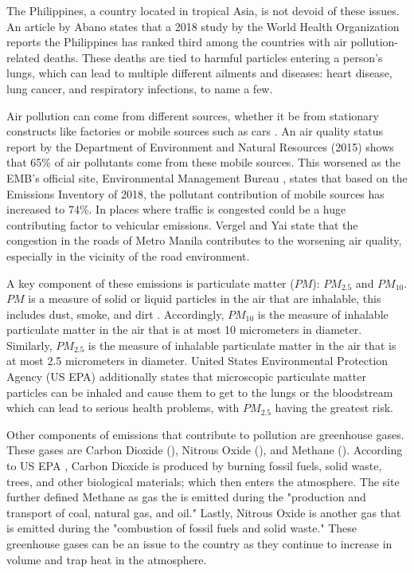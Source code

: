 The Philippines, a country located in tropical Asia, is not devoid of these issues. An article by Abano \citeyear{abano_2019} states that a 2018 study by the World Health Organization reports the Philippines has ranked third among the countries with air pollution-related deaths. These deaths are tied to harmful particles entering a person’s lungs, which can lead to multiple different ailments and diseases: heart disease, lung cancer, and respiratory infections, to name a few.

Air pollution can come from different sources, whether it be from stationary constructs like factories or mobile sources such as cars \cite{EMB_2015}. An air quality status report by the Department of Environment and Natural Resources (2015) shows that 65\% of air pollutants come from these mobile sources. This worsened as the EMB’s official site, Environmental Management Bureau \citeyear{EMB_2018}, states that based on the Emissions Inventory of 2018, the pollutant contribution of mobile sources has increased to  74\%. In places where traffic is congested could be a huge contributing factor to vehicular emissions. Vergel and Yai \citeyear{vergel_yai2000} state that the congestion in the roads of Metro Manila contributes to the worsening air quality, especially in the vicinity of the road environment.

A key component of these emissions is particulate matter ($PM$): $PM_{2.5}$ and $PM_{10}$. $PM$ is a measure of solid or liquid particles in the air that are inhalable, this includes dust, smoke, and dirt \cite{EPA_2022}. Accordingly, $PM_{10}$ is the measure of inhalable particulate matter in the air that is at most 10 micrometers in diameter. Similarly, $PM_{2.5}$ is the measure of inhalable particulate matter in the air that is at most 2.5 micrometers in diameter. United States Environmental Protection Agency (US EPA) \citeyear{EPA_2022} additionally states that microscopic particulate matter particles can be inhaled and cause them to get to the lungs or the bloodstream which can lead to serious health problems, with $PM_{2.5}$ having the greatest risk.

Other components of emissions that contribute to pollution are greenhouse gases. These gases are Carbon Dioxide (), Nitrous Oxide (), and Methane (). According to US EPA \citeyear{EPA_2023}, Carbon Dioxide is produced by burning fossil fuels, solid waste, trees, and other biological materials; which then enters the atmosphere. The site further defined Methane as gas the is emitted during the "production and transport of coal, natural gas, and oil." Lastly, Nitrous Oxide is another gas that is emitted during the "combustion of fossil fuels and solid waste." These greenhouse gases can be an issue to the country as they continue to increase in volume and trap heat in the atmosphere.

